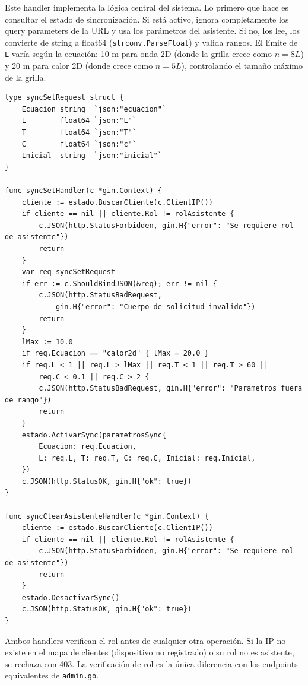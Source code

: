 \documentclass[12pt, a4paper]{article}
\begin{document}
Este handler implementa la lógica central del sistema. Lo primero que hace es consultar
el estado de sincronización. Si está activo, ignora completamente los query parameters
de la URL y usa los parámetros del asistente. Si no, los lee, los convierte de string a
float64 (\texttt{strconv.ParseFloat}) y valida rangos. El límite de \texttt{L} varía
según la ecuación: 10 m para onda 2D (donde la grilla crece como $n = 8L$) y 20 m para
calor 2D (donde crece como $n = 5L$), controlando el tamaño máximo de la grilla.

\begin{lstlisting}[style=golang, caption={\texttt{handlers.go} — sincronizacion desde asistente}]
type syncSetRequest struct {
    Ecuacion string  `json:"ecuacion"`
    L        float64 `json:"L"`
    T        float64 `json:"T"`
    C        float64 `json:"c"`
    Inicial  string  `json:"inicial"`
}

func syncSetHandler(c *gin.Context) {
    cliente := estado.BuscarCliente(c.ClientIP())
    if cliente == nil || cliente.Rol != rolAsistente {
        c.JSON(http.StatusForbidden, gin.H{"error": "Se requiere rol de asistente"})
        return
    }
    var req syncSetRequest
    if err := c.ShouldBindJSON(&req); err != nil {
        c.JSON(http.StatusBadRequest,
            gin.H{"error": "Cuerpo de solicitud invalido"})
        return
    }
    lMax := 10.0
    if req.Ecuacion == "calor2d" { lMax = 20.0 }
    if req.L < 1 || req.L > lMax || req.T < 1 || req.T > 60 ||
        req.C < 0.1 || req.C > 2 {
        c.JSON(http.StatusBadRequest, gin.H{"error": "Parametros fuera de rango"})
        return
    }
    estado.ActivarSync(parametrosSync{
        Ecuacion: req.Ecuacion,
        L: req.L, T: req.T, C: req.C, Inicial: req.Inicial,
    })
    c.JSON(http.StatusOK, gin.H{"ok": true})
}

func syncClearAsistenteHandler(c *gin.Context) {
    cliente := estado.BuscarCliente(c.ClientIP())
    if cliente == nil || cliente.Rol != rolAsistente {
        c.JSON(http.StatusForbidden, gin.H{"error": "Se requiere rol de asistente"})
        return
    }
    estado.DesactivarSync()
    c.JSON(http.StatusOK, gin.H{"ok": true})
}
\end{lstlisting}

Ambos handlers verifican el rol antes de cualquier otra operación. Si la IP no existe
en el mapa de clientes (dispositivo no registrado) o su rol no es asistente, se rechaza
con 403. La verificación de rol es la única diferencia con los endpoints equivalentes
de \texttt{admin.go}.
\end{document}
